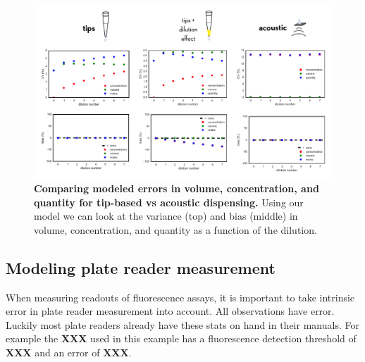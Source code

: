 \documentclass[aps,pre,twocolumn,nofootinbib,superscriptaddress,linenumbers]{revtex4-1}
\begin{document}
\begin{figure}[tb]
    \includegraphics[width=1.0\textwidth]{../figures/volumes-n-concentrations.pdf}

  \caption{{\bf Comparing modeled errors in volume, concentration, and quantity for tip-based vs acoustic dispensing.}
  Using our model we can look at the variance (top) and bias (middle) in volume, concentration, and quantity as a function of the dilution.
  }
  \label{fig:volumes-n-concentrations}
\end{figure}


\subsection*{Modeling plate reader measurement}

When measuring readouts of fluorescence assays, it is important to take intrinsic error in plate reader measurement into account. All observations have error. 
Luckily most plate readers already have these stats on hand in their manuals. 
For example the {\bf XXX} used in this example has a fluorescence detection threshold of {\bf XXX} and an error of {\bf XXX}.
\end{document}
